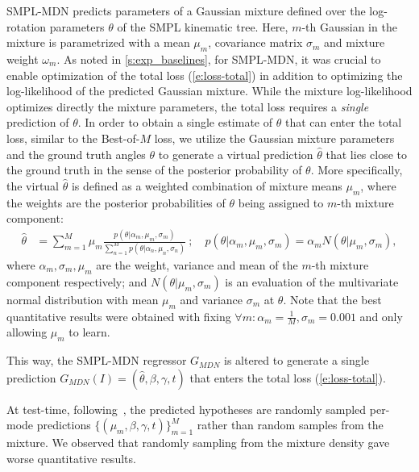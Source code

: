 SMPL-MDN predicts parameters of a Gaussian mixture defined over the log-rotation parameters $\theta$ of the SMPL kinematic tree.
Here, $m$-th Gaussian in the mixture is parametrized with a mean $\mu_m$, covariance matrix $\sigma_m$ and mixture weight $\omega_m$.
As noted in \cref{s:exp_baselines}, for SMPL-MDN, it was crucial to enable optimization of the total loss (\ref{e:loss-total}) in addition to optimizing the log-likelihood of the predicted Gaussian mixture.
While the mixture log-likelihood optimizes directly the mixture parameters, the total loss requires a \emph{single} prediction of $\theta$.
In order to obtain a single estimate of $\theta$ that can enter the total loss, similar to the Best-of-$M$ loss, we utilize the Gaussian mixture parameters and the ground truth angles $\theta$ to generate a virtual prediction $\hat \theta$ that lies close to the ground truth in the sense of the posterior probability of $\theta$.
More specifically, the virtual $\hat \theta$ is defined as a weighted combination of mixture means $\mu_m$, where the weights are the posterior probabilities of $\theta$ being assigned to $m$-th mixture component:
\begin{align}
\hat \theta &= 
\sum_{m=1}^{M} \mu_m 
\frac{
     p(\theta | \alpha_m, \mu_m, \sigma_m)
}{
    \sum_{n=1}^{M} p(\theta | \alpha_n, \mu_n, \sigma_n)
} ~ ; \quad
p(\theta | \alpha_m, \mu_m, \sigma_m)
= \alpha_m N( \theta | \mu_m, \sigma_m),
\end{align}
where $\alpha_m, \sigma_m, \mu_m$ are the weight, variance and mean of the $m$-th mixture component respectively; and $N( \theta | \mu_m, \sigma_m)$ is an evaluation of the multivariate normal distribution with mean $\mu_m$ and variance $\sigma_m$ at $\theta$. Note that the best quantitative results were obtained with fixing $\forall m: \alpha_m = \frac{1}{M}, \sigma_m = 0.001$ and only allowing $\mu_m$ to learn.

This way, the SMPL-MDN regressor $G_{MDN}$ is altered to generate a single prediction $G_{MDN}(I) = (\hat \theta, \beta, \gamma, t)$ that enters the total loss (\ref{e:loss-total}).

At test-time, following~\cite{li19generating}, the predicted hypotheses are randomly sampled per-mode predictions $\{(\mu_m, \beta, \gamma, t)\}_{m=1}^M$ rather than random samples from the mixture. We observed that randomly sampling from the mixture density gave worse quantitative results.

